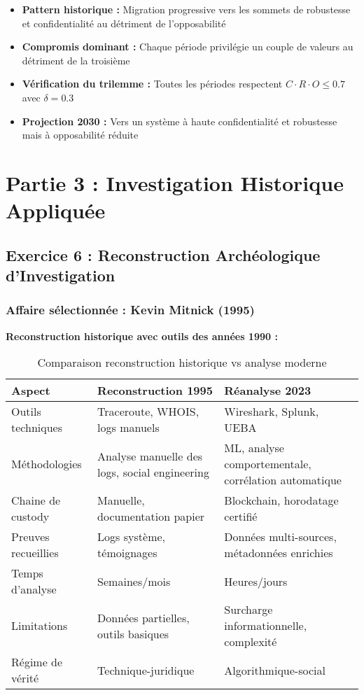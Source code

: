 \documentclass[12pt,a4paper]{article}
\begin{document}
\begin{itemize}
\item \textbf{Pattern historique :} Migration progressive vers les sommets de robustesse et confidentialité au détriment de l'opposabilité
\item \textbf{Compromis dominant :} Chaque période privilégie un couple de valeurs au détriment de la troisième
\item \textbf{Vérification du trilemme :} Toutes les périodes respectent $C \cdot R \cdot O \leq 0.7$ avec $\delta = 0.3$
\item \textbf{Projection 2030 :} Vers un système à haute confidentialité et robustesse mais à opposabilité réduite
\end{itemize}

\section{Partie 3 : Investigation Historique Appliquée}

\subsection{Exercice 6 : Reconstruction Archéologique d'Investigation}

\subsubsection{Affaire sélectionnée : Kevin Mitnick (1995)}

\textbf{Reconstruction historique avec outils des années 1990 :}

\begin{table}[H]
\centering
\begin{tabular}{|p{}|p{}|p{}|}
\hline
\textbf{Aspect} & \textbf{Reconstruction 1995} & \textbf{Réanalyse 2023} \\
\hline
Outils techniques & Traceroute, WHOIS, logs manuels & Wireshark, Splunk, UEBA \\
\hline
Méthodologies & Analyse manuelle des logs, social engineering & ML, analyse comportementale, corrélation automatique \\
\hline
Chaine de custody & Manuelle, documentation papier & Blockchain, horodatage certifié \\
\hline
Preuves recueillies & Logs système, témoignages & Données multi-sources, métadonnées enrichies \\
\hline
Temps d'analyse & Semaines/mois & Heures/jours \\
\hline
Limitations & Données partielles, outils basiques & Surcharge informationnelle, complexité \\
\hline
Régime de vérité & Technique-juridique & Algorithmique-social \\
\hline
\end{tabular}
\caption{Comparaison reconstruction historique vs analyse moderne}
\end{table}
\end{document}
